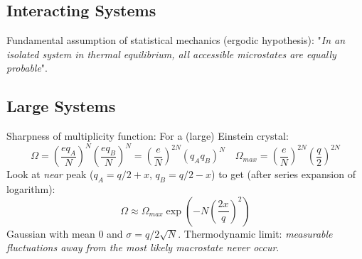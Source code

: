 \documentclass[a4paper,norsk, 10pt]{article}
\begin{document}
\subsection{Interacting Systems}
Fundamental assumption of statistical mechanics (ergodic hypothesis): "\textit{In an isolated system in thermal equilibrium, all accessible microstates are equally probable}".
\subsection{Large Systems}
Sharpness of multiplicity function: For a (large) Einstein crystal:
\begin{equation}
\Omega = \left(\frac{eq_A}{N}\right)^N\left(\frac{eq_B}{N}\right)^N = \left(\frac{e}{N}\right)^{2N}(q_Aq_B)^N \quad \Omega_{max}=\left(\frac{e}{N}\right)^{2N}\left(\frac{q}{2}\right)^{2N}
\end{equation}
Look at \textit{near} peak ($q_A=q/2+x$, $q_B=q/2-x$) to get (after series expansion of logarithm):
\begin{equation}
\Omega \approx \Omega_{max}\exp\left(-N\left(\frac{2x}{q}\right)^2\right)
\end{equation}
Gaussian with mean $0$ and $\sigma=q/2\sqrt{N}$. Thermodynamic limit: \textit{measurable fluctuations away from the most likely macrostate never occur}.
\end{document}
